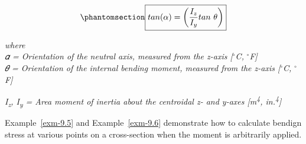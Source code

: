 \documentclass[
  letterpaper,
  DIV=11,
  numbers=noendperiod]{scrreprt}
\theoremstyle{definition}
\theoremstyle{remark}
\begin{document}
\begin{equation}\phantomsection\label{eq-9.6}{
\boxed{tan(\alpha)=\left(\frac{I_z}{I_y}tan~\theta\right)}
}\end{equation}

\emph{where}\\
\emph{𝛼 = Orientation of the neutral axis, measured from the z-axis
{[}}\(^\circ\)\emph{C,} \(^\circ\)\emph{F{]}}\\
\emph{𝜃 = Orientation of the internal bending moment, measured from the
z-axis {[}}\(^\circ\)\emph{C,} \(^\circ\)\emph{F{]}}

\emph{I\textsubscript{z}, I\textsubscript{y} = Area moment of inertia
about the centroidal z- and y-axes {[}m\textsuperscript{4},
in.\textsuperscript{4}{]}}

Example~\ref{exm-9.5} and Example~\ref{exm-9.6} demonstrate how to
calculate bendign stress at various points on a cross-section when the
moment is arbitrarily applied.
\end{document}
